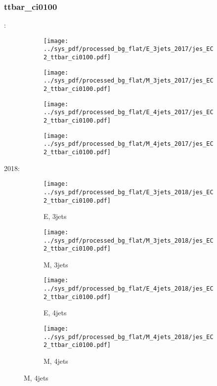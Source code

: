 \documentclass{beamer}
\begin{document}
\begin{frame}
\frametitle{ttbar_ci0100}
\fontsize{5}{1}:
\begin{figure}
\centering
\begin{subfigure}[b]{0.24\textwidth}
\texttt{[image: ../sys\_pdf/processed\_bg\_flat/E\_3jets\_2017/jes\_EC2\_ttbar\_ci0100.pdf]}
\end{subfigure}
\begin{subfigure}[b]{0.24\textwidth}
\texttt{[image: ../sys\_pdf/processed\_bg\_flat/M\_3jets\_2017/jes\_EC2\_ttbar\_ci0100.pdf]}
\end{subfigure}
\begin{subfigure}[b]{0.24\textwidth}
\texttt{[image: ../sys\_pdf/processed\_bg\_flat/E\_4jets\_2017/jes\_EC2\_ttbar\_ci0100.pdf]}
\end{subfigure}
\begin{subfigure}[b]{0.24\textwidth}
\texttt{[image: ../sys\_pdf/processed\_bg\_flat/M\_4jets\_2017/jes\_EC2\_ttbar\_ci0100.pdf]}
\end{subfigure}
\end{figure}
2018:
\begin{figure}
\centering
\begin{subfigure}[b]{0.24\textwidth}
\texttt{[image: ../sys\_pdf/processed\_bg\_flat/E\_3jets\_2018/jes\_EC2\_ttbar\_ci0100.pdf]}
\captionsetup{font=tiny}
\caption{E, 3jets}
\end{subfigure}
\begin{subfigure}[b]{0.24\textwidth}
\texttt{[image: ../sys\_pdf/processed\_bg\_flat/M\_3jets\_2018/jes\_EC2\_ttbar\_ci0100.pdf]}
\captionsetup{font=tiny}
\caption{M, 3jets}
\end{subfigure}
\begin{subfigure}[b]{0.24\textwidth}
\texttt{[image: ../sys\_pdf/processed\_bg\_flat/E\_4jets\_2018/jes\_EC2\_ttbar\_ci0100.pdf]}
\captionsetup{font=tiny}
\caption{E, 4jets}
\end{subfigure}
\begin{subfigure}[b]{0.24\textwidth}
\texttt{[image: ../sys\_pdf/processed\_bg\_flat/M\_4jets\_2018/jes\_EC2\_ttbar\_ci0100.pdf]}
\captionsetup{font=tiny}
\caption{M, 4jets}
\end{subfigure}
\end{figure}
\end{frame}
\end{document}

